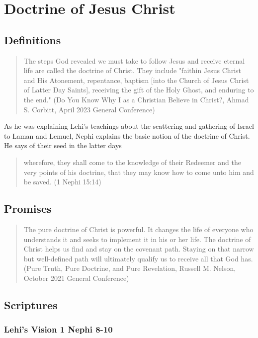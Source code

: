 \chapter{Doctrine of Jesus Christ}

\section{Definitions}

\begin{quotation}
The steps God revealed we must take to follow Jesus and receive eternal life are called the doctrine of Christ. They include "faithin Jesus Christ and His Atonement, repentance, baptism [into the Church of Jesus Christ of Latter Day Saints], receiving the gift of the Holy Ghost, and enduring to the end." (Do You Know Why I as a Christian Believe in Christ?, Ahmad S. Corbitt, April 2023 General Conference)
\end{quotation}

As he was explaining Lehi's teachings about the scattering and gathering of Israel to Laman and Lemuel, Nephi explains the basic notion of the doctrine of Christ. He says of their seed in the latter days

\begin{quotation}
wherefore, they shall come to the knowledge of their Redeemer and the very points of his doctrine, that they may know how to come unto him and be saved. (1 Nephi 15:14)
\end{quotation}

\section{Promises}

\begin{quotation}
The pure doctrine of Christ is powerful. It changes the life of everyone who understands it and seeks to implement it in his or her life. The doctrine of Christ helps us find and stay on the covenant path. Staying on that narrow but well-defined path will ultimately qualify us to receive all that God has. (Pure Truth, Pure Doctrine, and Pure Revelation, Russell M. Nelson, October 2021 General Conference)
\end{quotation}

\section{Scriptures}

\subsection{Lehi's Vision 1 Nephi 8-10}

